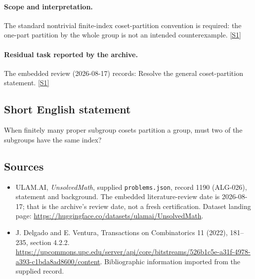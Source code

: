 \documentclass[11pt,a4paper]{article}
\newcommand{\sref}[2]{\hyperlink{source:#1:#2}{[S#2]}}
\begin{document}
\paragraph{Scope and interpretation.}

The standard nontrivial finite-index coset-partition convention is required: the one-part partition by the whole group is not an intended counterexample. \sref{1190}{1}

\paragraph{Residual task reported by the archive.}

The embedded review (2026-08-17) records: Resolve the general coset-partition statement. \sref{1190}{1}

\subsection{Short English statement}

When finitely many proper subgroup cosets partition a group, must two of the subgroups have the same index?

\subsection{Sources}

{\small

\begin{itemize}

\item[\hypertarget{source:1190:1}{S1}] ULAM.AI, \emph{UnsolvedMath}, supplied \texttt{problems.json}, record 1190 (ALG-026), statement and background. The embedded literature-review date is 2026-08-17; that is the archive’s review date, not a fresh certification. Dataset landing page: \url{https://huggingface.co/datasets/ulamai/UnsolvedMath}.

\item[\hypertarget{source:1190:2}{S2}] J. Delgado and E. Ventura, Transactions on Combinatorics 11 (2022), 181--235, section 4.2.2. \url{https://upcommons.upc.edu/server/api/core/bitstreams/526b1c5e-a31f-4978-a393-c1bda8ad8600/content}. Bibliographic information imported from the supplied record.

\end{itemize}

}

\label{end:1190}
\end{document}
